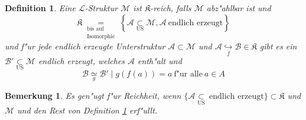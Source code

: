 \documentclass[a4paper,12pt,numbers=noenddot,parskip=full]{scrartcl}
\newcommand{\scrL}{\mathcal{L}}
\newcommand{\scrA}{\mathcal{A}}
\newcommand{\scrB}{\mathcal{B}}
\newcommand{\scrM}{\mathcal{M}}
\newcommand{\fK}{\mathfrak{K}}
\theoremstyle{dotless}
\newtheorem{definition}[theorem]{Definition}
\newtheorem{remark}[theorem]{Bemerkung}
\begin{document}
\begin{definition}\label{reich}
	Eine $\scrL$-Struktur $\scrM$ ist $\fK$-reich, falls $\scrM$ abz"ahlbar ist und 
	\begin{equation*}
		\fK \underset{\substack{\text{bis auf}\\\text{Isomorphie}}}{=} \left\{\scrA \underset{\text{US}}{\subset}\scrM, \scrA~ \text{endlich erzeugt} \right\}
	\end{equation*}
	und f"ur jede endlich erzeugte Unterstruktur $\scrA \subset \scrM$ und $\scrA \underset{f}{\hookrightarrow} \scrB \in \fK$ gibt es ein $\scrB' \underset{\text{US}}{\subset} \scrM$ endlich erzeugt, welches $\scrA$ enth"alt und
	\begin{equation*}
		\scrB \underset{g}{\simeq} \scrB' \mid g(f(a))=a~ \text{f"ur alle}~ a \in A
	\end{equation*}
\end{definition}
\begin{remark}
	Es gen"ugt f"ur Reichheit, wenn $\{\scrA \underset{\text{US}}{\subset}~ \text{endlich erzeugt} \} \subset \fK$ und $\scrM$ und den Rest von Definition \ref{reich} erf"ullt.
\end{remark}
\end{document}
